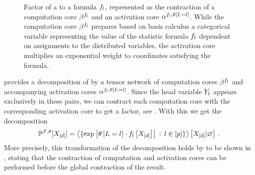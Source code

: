 \begin{figure}[t!]
    \begin{center}
        
    \end{center}
    \caption{Factor of a \MarkovLogicNetwork{} to a formula $f_{l}$, represented as the contraction of a computation core $\beta^{f_{l}}$ and an activation core $\alpha^{f_{l},\theta\left[L_{}=l_{}\right]}$.
    While the computation core $\beta^{f_{l}}$ prepares based on basis calculus a categorical variable representing the value of the statistic formula $f_{l}$ dependent on assignments to the distributed variables, the activation core multiplies an exponential weight to coordinates satisfying the formula.
    }
    \label{fig:mlnFactor}
\end{figure}

 provides a decomposition of \MarkovLogicNetworks{} by a tensor network of computation cores $\beta^{f_{l}}$ and accompanying activation cores $\alpha^{f_{l},\theta\left[L_{}=l_{}\right]}$.
Since the head variable $Y_{l}$ appears exclusively in these pairs, we can contract each computation core with the corresponding activation core to get a factor, see .
With this we get the decomposition
\begin{align*}
    \mathbb{P}^{\mathcal{F},\theta}[X_{[d]}]
    = \left\langle \{\mathrm{exp}\left[\theta\left[L_{}=l_{}\right]\cdot f_{l}\left[X_{[d]}\right]\right] \,:\, l\in[p]\}\right\rangle \left[ X_{[d]} | \varnothing \right] \, .
\end{align*}
More precisely, this transformation of the decomposition holds by  to be shown in , stating that the contraction of computation and activation cores can be performed before the global contraction of the result.

